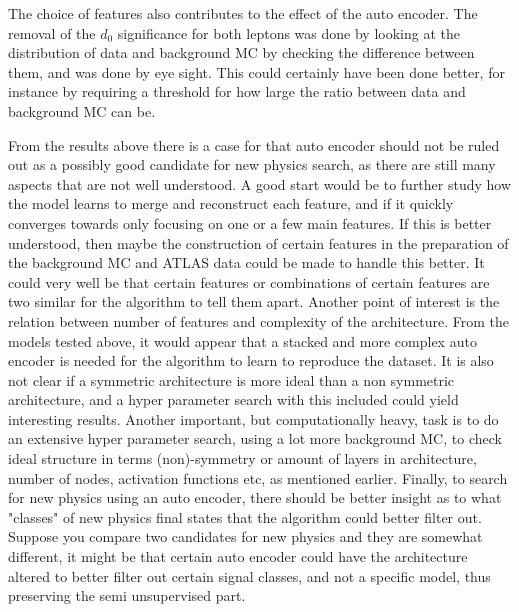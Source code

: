 \documentclass[ reprint, amsmath,amssymb, aps, nofootinbib]{revtex4-2}
\begin{document}
The choice of features also contributes to the effect of the auto encoder. The removal of the $d_0$ significance for both leptons was done by looking at the distribution of data and background MC by checking the difference between them, and was done by eye sight. This could certainly have been done better, for instance by requiring a threshold for how large the ratio between data and background MC can be. \par \par



From the results above there is a case for that auto encoder should not be ruled out as a possibly good candidate for new physics search, as there are still many aspects that are not well understood. A good start would be to further study how the model learns to merge and reconstruct each feature, and if it quickly converges towards only focusing on one or a few main features. If this is better understood, then maybe the construction of certain features in the preparation of the background MC and ATLAS data could be made to handle this better. It could very well be that certain features or combinations of certain features are two similar for the algorithm to tell them apart. Another point of interest is the relation between number of features and complexity of the architecture. From the models tested above, it would appear that a stacked and more complex auto encoder is needed for the algorithm to learn to reproduce the dataset. It is also not clear if a symmetric architecture is more ideal than a non symmetric architecture, and a hyper parameter search with this included could yield interesting results. Another important, but computationally heavy, task is to do an extensive hyper parameter search, using a lot more background MC, to check ideal structure in terms (non)-symmetry or amount of layers in architecture, number of nodes, activation functions etc, as mentioned earlier. Finally, to search for new physics using an auto encoder, there should be better insight as to what "classes" of new physics final states that the algorithm could better filter out. Suppose you compare two candidates for new physics and they are somewhat different, it might be that certain auto encoder could have the architecture altered to better filter out certain signal classes, and not a specific model, thus preserving the semi unsupervised part.   \par \par

\end{document}

